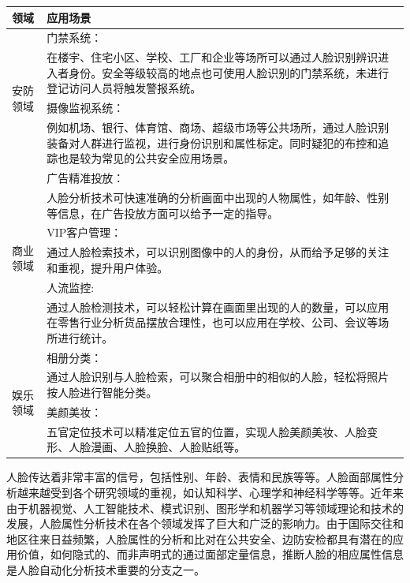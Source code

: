 \begin{table}[htbp]  %
\linespread{0.5} 
\centering  %
\label{tab1:facelingyu}
\begin{tabular}{lp{14cm}}  %
\midrule
领域&应用场景\\[1.5ex]
\hline
\multirow{4}{2cm}{安防领域}&门禁系统：\\&在楼宇、住宅小区、学校、工厂和企业等场所可以通过人脸识别辨识进入者身份。安全等级较高的地点也可使用人脸识别的门禁系统，未进行登记访问人员将触发警报系统。\\&摄像监视系统：\\&例如机场、银行、体育馆、商场、超级市场等公共场所，通过人脸识别装备对人群进行监视，进行身份识别和属性标定。同时疑犯的布控和追踪也是较为常见的公共安全应用场景。\\[2.5ex]

\multirow{6}{2cm}{商业领域}&广告精准投放：\\&人脸分析技术可快速准确的分析画面中出现的人物属性，如年龄、性别等信息，在广告投放方面可以给予一定的指导。\\&VIP客户管理：\\&通过人脸检索技术，可以识别图像中的人的身份，从而给予足够的关注和重视，提升用户体验。\\&人流监控:\\&通过人脸检测技术，可以轻松计算在画面里出现的人的数量，可以应用在零售行业分析货品摆放合理性，也可以应用在学校、公司、会议等场所进行统计。\\[2.5ex]

\multirow{4}{2cm}{娱乐领域}&相册分类：\\&通过人脸识别与人脸检索，可以聚合相册中的相似的人脸，轻松将照片按人脸进行智能分类。\\&美颜美妆：\\&五官定位技术可以精准定位五官的位置，实现人脸美颜美妆、人脸变形、人脸漫画、人脸换脸、人脸贴纸等。\\[2.5ex]

\bottomrule
\end{tabular}
\end{table}

人脸传达着非常丰富的信号，包括性别、年龄、表情和民族等等。人脸面部属性分析越来越受到各个研究领域的重视，如认知科学、心理学和神经科学等等。近年来由于机器视觉、人工智能技术、模式识别、图形学和机器学习等领域理论和技术的发展，人脸属性分析技术在各个领域发挥了巨大和广泛的影响力。由于国际交往和地区往来日益频繁，人脸属性的分析和比对在公共安全、边防安检都具有潜在的应用价值，如何隐式的、而非声明式的通过面部定量信息，推断人脸的相应属性信息是人脸自动化分析技术重要的分支之一。



